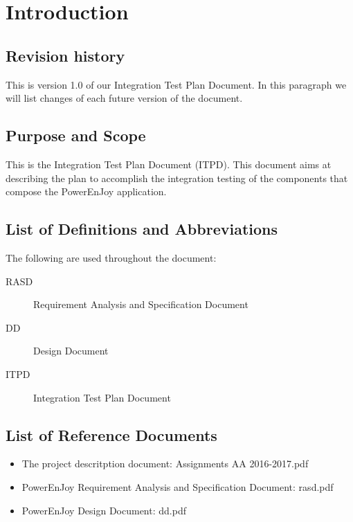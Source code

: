 \section{Introduction}

\subsection{Revision history}
This is version 1.0 of our Integration Test Plan Document.
In this paragraph we will list changes of each future version of the document.

\subsection{Purpose and Scope}
This is the Integration Test Plan Document (ITPD). This document aims at describing the plan to accomplish the integration testing of the components that compose the PowerEnJoy application.

\subsection{List of Definitions and Abbreviations}
The following are used throughout the document:
\begin{description}
	\item [RASD] Requirement Analysis and Specification Document
	\item [DD] Design Document
	\item [ITPD] Integration Test Plan Document
\end{description}

\subsection{List of Reference Documents}
\begin{itemize}
	\item The project descritption document: Assignments AA 2016-2017.pdf
	\item PowerEnJoy Requirement Analysis and Specification Document: rasd.pdf
	\item PowerEnJoy Design Document: dd.pdf
\end{itemize}

